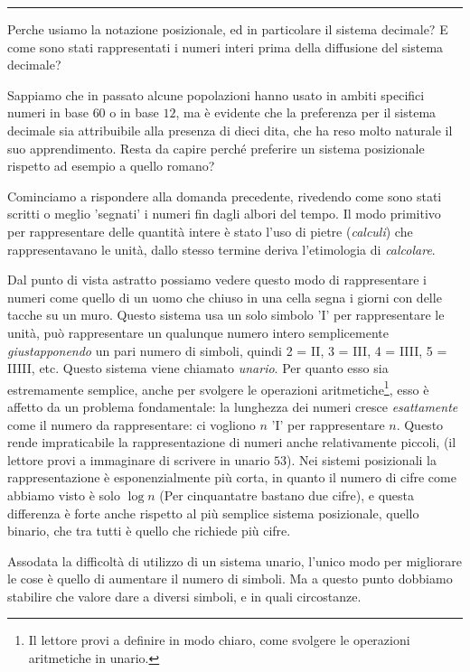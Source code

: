 {\hfill \rule{0.9\textwidth}{0.5pt} \hfill}
\small

Perche usiamo la notazione posizionale, ed in particolare il sistema decimale?
E come sono stati rappresentati i numeri interi prima della diffusione del
sistema decimale?

Sappiamo che in passato alcune popolazioni hanno usato in ambiti specifici
numeri in base $60$ o in base $12$, ma è evidente che la preferenza per il
sistema decimale sia attribuibile alla presenza di dieci dita, che ha reso
molto naturale il suo apprendimento. Resta da capire perché preferire un
sistema posizionale rispetto ad esempio a quello romano?

Cominciamo a rispondere alla domanda precedente, rivedendo come sono stati
scritti o meglio 'segnati' i numeri fin dagli albori del tempo. Il modo
primitivo per rappresentare delle quantità intere è stato l'uso di pietre
(\emph{calculi}) che rappresentavano le unità, dallo stesso termine deriva
l'etimologia di \emph{calcolare}.

Dal punto di vista astratto possiamo vedere questo modo di rappresentare i
numeri come quello di un uomo che chiuso in una cella segna i giorni con delle
tacche su un muro. Questo sistema usa un solo simbolo '\textsc{I}' per
rappresentare le unità, può rappresentare un qualunque numero intero
semplicemente \emph{giustapponendo} un pari numero di simboli, quindi 2 =
\textsc{II}, 3 = \textsc{III}, 4 = \textsc{IIII}, 5 = \textsc{IIIII}, etc.
Questo sistema viene chiamato \emph{unario}. Per quanto
esso sia estremamente semplice, anche per svolgere le operazioni
aritmetiche\footnote{Il lettore provi a definire in modo chiaro, come svolgere
le operazioni aritmetiche in unario.}, esso è affetto da un problema
fondamentale: la lunghezza dei numeri cresce \emph{esattamente} come il numero
da rappresentare: ci vogliono $n$ 'I' per rappresentare $n$. Questo rende
impraticabile la rappresentazione di numeri anche relativamente piccoli, (il
lettore provi a immaginare di scrivere in unario $53$). Nei sistemi posizionali
la rappresentazione è esponenzialmente più corta, in quanto il numero di cifre
come abbiamo visto è solo $\log n$ (Per cinquantatre bastano due cifre), e
questa differenza è forte anche rispetto al più semplice sistema posizionale,
quello binario, che tra tutti è quello che richiede più cifre.

Assodata la difficoltà di utilizzo di un sistema unario, l'unico modo per
migliorare le cose è quello di aumentare il numero di simboli. Ma a questo
punto dobbiamo stabilire che valore dare a diversi simboli, e in quali
circostanze.

